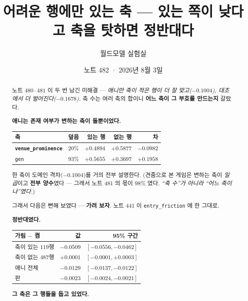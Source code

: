 \documentclass[11pt]{article}
\begin{document}
\title{어려운 행에만 있는 축 --- 있는 쪽이 낮다고 축을 탓하면 정반대다}
\author{월드모델 실험실}
\date{노트 482 · 2026년 8월 3일}
\maketitle

\begin{abstract}
노트 $480 \cdot 481$ 이 두 번 남긴 미해결 --- \emph{애니만 축이 적은 행이
더 잘 맞고($-0.1004$), 대조에서 더 벌어진다($-0.1678$).} 축 수는 여러
축의 합이니 \textbf{어느 축이 그 부호를 만드는지} 갈랐다.

\textbf{애니는 존재 여부가 변하는 축이 둘뿐이었다.}

\begin{center}
\begin{tabular}{lrrrr}
\hline
축 & 덮음 & 있는 행 & 없는 행 & 차 \\
\hline
\textbf{\texttt{venue\_prominence}} & $20\%$ & $+0.4894$ & $+0.5877$ & $\mathbf{-0.0982}$ \\
\texttt{gen} & $93\%$ & $+0.5655$ & $+0.3697$ & $+0.1958$ \\
\hline
\end{tabular}
\end{center}

한 축이 도메인 격차($-0.1004$)를 거의 전부 설명한다. (견줌으로 본 게임은
변하는 축이 \emph{일곱}이고 \textbf{전부 양수}였다 --- 그래서 노트 481 의
몫이 $98\%$ 였다. \emph{``축 수''가 아니라 ``어느 축이냐''였다.})

그래서 다음은 뻔해 보였다 --- \textbf{가려 보자}. 노트 441 이
\texttt{entry\_friction} 에 한 그대로.

\textbf{정반대였다.}

\begin{center}
\begin{tabular}{lrr}
\hline
가림 $-$ 켬 & 값 & 95\% 구간 \\
\hline
축이 있는 $119$행 & $\mathbf{-0.0509}$ & $[-0.0556, -0.0462]$ \\
축이 없는 $487$행 & $+0.0001$ & $[-0.0001, +0.0003]$ \\
애니 전체 & $-0.0129$ & $[-0.0137, -0.0122]$ \\
판 & $-0.0023$ & $[-0.0024, -0.0021]$ \\
\hline
\end{tabular}
\end{center}

\textbf{그 축은 그 행들을 돕고 있었다.}
\end{abstract}
\end{document}
